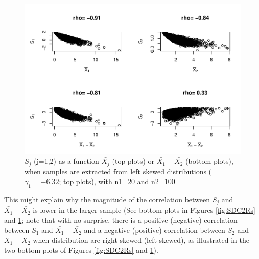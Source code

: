\documentclass[
  man]{apa6}
\begin{document}
\begin{figure}
\centering
\includegraphics{Correlations-between-the-sample-means-difference-and-standardizers-of-all-estimators,-and-implications-on-biases-and-variances-of-all-estimators_files/figure-latex/SDC2Ls-1.pdf}
\caption{\label{fig:SDC2Ls}\(S_j\) (j=1,2) as a function \(\bar{X_j}\) (top plots) or \(\bar{X_1}-\bar{X_2}\) (bottom plots), when samples are extracted from left skewed distributions (\(\gamma_1 = -6.32\); top plots), with n1=20 and n2=100}
\end{figure}

This might explain why the magnitude of the correlation between \(S_j\) and \(\bar{X_1}-\bar{X_2}\) is lower in the larger sample (See bottom plots in Figures \ref{fig:SDC2Rs} and \ref{fig:SDC2Ls}; note that with no surprise, there is a positive (negative) correlation between \(S_1\) and \(\bar{X_1}-\bar{X_2}\) and a negative (positive) correlation between \(S_2\) and \(\bar{X_1}-\bar{X_2}\) when distribution are right-skewed (left-skewed), as illustrated in the two bottom plots of Figures \ref{fig:SDC2Rs} and \ref{fig:SDC2Ls}).
\end{document}
